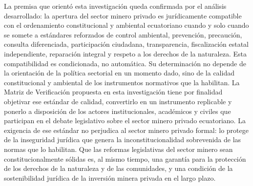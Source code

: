 La premisa que orientó esta investigación queda confirmada por el análisis desarrollado: la apertura del sector minero privado es jurídicamente compatible con el ordenamiento constitucional y ambiental ecuatoriano cuando y solo cuando se somete a estándares reforzados de control ambiental, prevención, precaución, consulta diferenciada, participación ciudadana, transparencia, fiscalización estatal independiente, reparación integral y respeto a los derechos de la naturaleza. Esta compatibilidad es condicionada, no automática. Su determinación no depende de la orientación de la política sectorial en un momento dado, sino de la calidad constitucional y ambiental de los instrumentos normativos que la habilitan. La Matriz de Verificación propuesta en esta investigación tiene por finalidad objetivar ese estándar de calidad, convertirlo en un instrumento replicable y ponerlo a disposición de los actores institucionales, académicos y civiles que participan en el debate legislativo sobre el sector minero privado ecuatoriano. La exigencia de ese estándar no perjudica al sector minero privado formal: lo protege de la inseguridad jurídica que genera la inconstitucionalidad sobrevenida de las normas que lo habilitan. Que las reformas legislativas del sector minero sean constitucionalmente sólidas es, al mismo tiempo, una garantía para la protección de los derechos de la naturaleza y de las comunidades, y una condición de la sostenibilidad jurídica de la inversión minera privada en el largo plazo.
